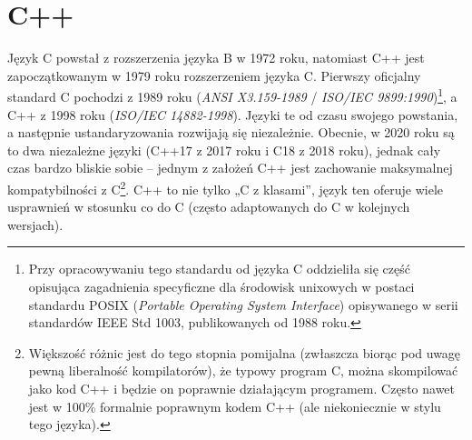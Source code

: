 % 
% 
% 
% 

\section{C++}

Język C powstał z rozszerzenia języka B w 1972 roku, natomiast C++ jest zapoczątkowanym w 1979 roku rozszerzeniem języka C.
Pierwszy oficjalny standard C pochodzi z 1989 roku (\textit{ANSI X3.159-1989} / \textit{ISO/IEC 9899:1990})\footnote{Przy opracowywaniu tego standardu od języka C oddzieliła się część opisująca zagadnienia specyficzne dla środowisk unixowych w postaci standardu POSIX (\textit{Portable Operating System Interface}) opisywanego w serii standardów IEEE Std 1003, publikowanych od 1988 roku.}, a C++ z 1998 roku (\textit{ISO/IEC 14882-1998}).
Języki te od czasu swojego powstania, a następnie ustandaryzowania rozwijają się niezależnie.
Obecnie, w 2020 roku są to dwa niezależne języki (C++17 z 2017 roku i C18 z 2018 roku), jednak cały czas bardzo bliskie sobie – jednym z założeń C++ jest zachowanie maksymalnej kompatybilności z C\footnote{
	Większość różnic jest do tego stopnia pomijalna (zwłaszcza biorąc pod uwagę pewną liberalność kompilatorów), że typowy program C, można skompilować jako kod C++ i będzie on poprawnie działającym programem.
	Często nawet jest w 100\% formalnie poprawnym kodem C++ (ale niekoniecznie w stylu tego języka).
}.
C++ to nie tylko „C z klasami”, język ten oferuje wiele usprawnień w stosunku co do C (często adaptowanych do C w kolejnych wersjach).

